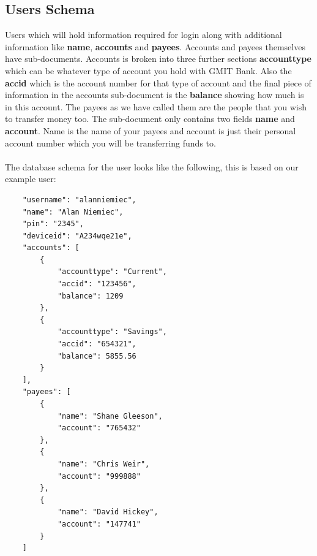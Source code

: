 \subsection{Users Schema}
 Users which will hold information required for login along with additional information like \textbf{name}, \textbf{accounts} and \textbf{payees}. Accounts and payees themselves have sub-documents. Accounts is broken into three further sections \textbf{accounttype} which can be whatever type of account you hold with GMIT Bank. Also the \textbf{accid} which is the account number for that type of account and the final piece of information in the accounts sub-document is the \textbf{balance} showing how much is in this account. The payees as we have called them are the people that you wish to transfer money too. The sub-document only contains two fields \textbf{name} and \textbf{account}. Name is the name of your payees and account is just their personal account number which you will be transferring funds to. \paragraph{}

The database schema for the user looks like the following, this is based on our example user:
\begin{verbatim}
    "username": "alanniemiec",
    "name": "Alan Niemiec",
    "pin": "2345",
    "deviceid": "A234wqe21e",
    "accounts": [
        {
            "accounttype": "Current",
            "accid": "123456",
            "balance": 1209
        },
        {
            "accounttype": "Savings",
            "accid": "654321",
            "balance": 5855.56
        }
    ],
    "payees": [
        {
            "name": "Shane Gleeson",
            "account": "765432"
        },
        {
            "name": "Chris Weir",
            "account": "999888"
        },
        {
            "name": "David Hickey",
            "account": "147741"
        }
    ]
\end{verbatim}

